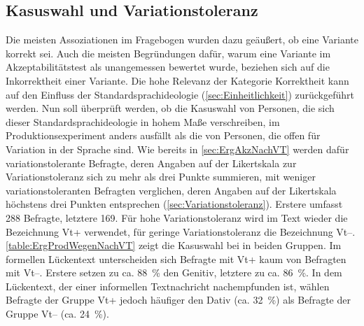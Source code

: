 \subsection{Kasuswahl und Variationstoleranz}
\label{sec:ErgProdNachVT}
Die meisten Assoziationen im Fragebogen wurden dazu geäußert, ob eine Variante korrekt sei.
Auch die meisten Begründungen dafür, warum eine Variante im Akzeptabilitätstest als unangemessen bewertet wurde, beziehen sich auf die Inkorrektheit einer Variante. 
Die hohe Relevanz der Kategorie \glqq Korrektheit\grqq{} kann auf den Einfluss der Standardsprachideologie (\autoref{sec:Einheitlichkeit}) zurückgeführt werden. 
Nun soll überprüft werden, ob die Kasuswahl von Personen, die sich dieser Standardsprachideologie in hohem Maße verschreiben, im Produktionsexperiment anders ausfällt als die von Personen, die offen für Variation in der Sprache sind. 
Wie bereits in \autoref{sec:ErgAkzNachVT} %
werden dafür variationstolerante Befragte, deren Angaben auf der Likertskala zur Variationstoleranz sich zu mehr als drei Punkte summieren, mit weniger variationstoleranten Befragten verglichen, deren Angaben auf der Likertskala höchstens drei Punkten entsprechen (\autoref{sec:Variationstoleranz}). %
Erstere umfasst 288 Befragte, letztere 169. 
Für hohe Variationstoleranz wird im Text wieder die Bezeichnung Vt+ verwendet, für geringe Variationstoleranz die Bezeichnung Vt--. 
 \autoref{table:ErgProdWegenNachVT} zeigt die Kasuswahl bei \wegen{} in beiden Gruppen.
Im formellen Lückentext unterscheiden sich Befragte mit Vt+ kaum von Befragten mit Vt--. 
Erstere setzen zu ca. 88~\% den Genitiv, letztere zu ca. 86~\%. 
In dem Lückentext, der einer informellen Textnachricht nachempfunden ist, wählen Befragte der Gruppe Vt+ jedoch häufiger den Dativ (ca. 32~\%) als Befragte der Gruppe Vt-- (ca. 24~\%). 

